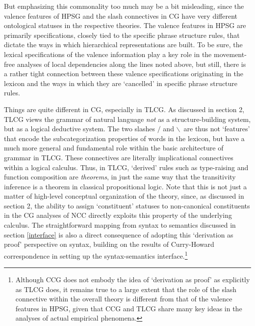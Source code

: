 \documentclass[output=paper]{langsci/langscibook}
\begin{document}
But emphasizing this commonality too much may be a bit misleading,
since the valence features of HPSG and the slash connectives in CG
have very different ontological statuses in the respective theories.
The valence features in HPSG are primarily specifications, closely
tied to the specific phrase structure rules, that dictate the ways in
which hierarchical representations are built. To be sure, the lexical
specifications of the valence information play a key role in the
movement-free analyses of local dependencies along the lines noted
above, but still, there is a rather tight connection between these
valence specifications originating in the lexicon and the ways in
which they are `cancelled' in specific phrase structure rules.

Things are quite different in CG, especially in TLCG. As discussed in
section 2, TLCG views the grammar of natural language \emph{not} as a
structure-building system, but as a logical deductive system. The two
slashes \ensuremath{/} and \ensuremath{\backslash}\ are thus not `features' that encode the
subcategorization properties of words in the lexicon, but have a much
more general and fundamental role within the basic architecture of
grammar in TLCG. These connectives are literally 
implicational connectives within a logical calculus. Thus, in TLCG,
`derived' rules such as
type-raising and function composition are \emph{theorems}, in just the same
way that the 
transitivity inference is a theorem in classical propositional logic.
Note that this is not just a matter of high-level conceptual
organization of the theory, since, as discussed in section 2, the
ability to assign `constituent' statuses to non-canonical constituents
in the CG analyses of NCC directly exploits this property of the
underlying calculus. The straightforward mapping from syntax to
semantics discussed in section \ref{interface} is also a direct
consequence of adopting this `derivation as proof' perspective on
syntax, building on the results of Curry-Howard correspondence
\citep{howard1969} in
setting up the syntax-semantics interface.\footnote{Although CCG does
not embody the idea of `derivation as proof' as explicitly as TLCG
does, it remains true to a large extent that the role of the slash
connective within the overall theory is different from that of the
valence features in HPSG, given that CCG and TLCG share many key
ideas in the analyses of actual empirical phenomena.}

\end{document}
